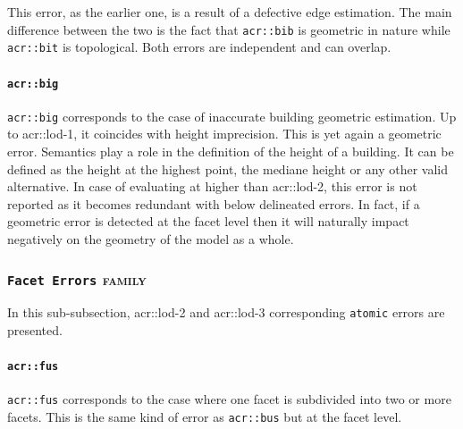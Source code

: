                 This error, as the earlier one, is a result of a defective edge estimation.
                The main difference between the two is the fact that \texttt{\gls{acr::bib}} is geometric in nature while \texttt{\gls{acr::bit}} is topological.
                Both errors are independent and can overlap.

            \paragraph{\texttt{\acrlong*{acr::big}}}
                \texttt{\gls{acr::big}} corresponds to the case of inaccurate building geometric estimation.
                Up to \gls{acr::lod}-1, it coincides with height imprecision.
                This is yet again a geometric error.
                Semantics play a role in the definition of the height of a building.
                It can be defined as the height at the highest point, the mediane height or any other valid alternative.
                In case of evaluating at higher than \gls{acr::lod}-2, this error is not reported as it becomes redundant with below delineated errors.
                In fact, if a geometric error is detected at the facet level then it will naturally impact negatively on the geometry of the model as a whole.
            
        \subsubsection{\texttt{Facet Errors} \textsc{family}}
            In this sub-subsection, \gls{acr::lod}-2 and \gls{acr::lod}-3 corresponding \texttt{atomic} errors are presented.

            \paragraph{\texttt{\acrlong*{acr::fus}}}
                \texttt{\gls{acr::fus}} corresponds to the case where one facet is subdivided into two or more facets.
                This is the same kind of error as \texttt{\gls{acr::bus}} but at the facet level.\\

